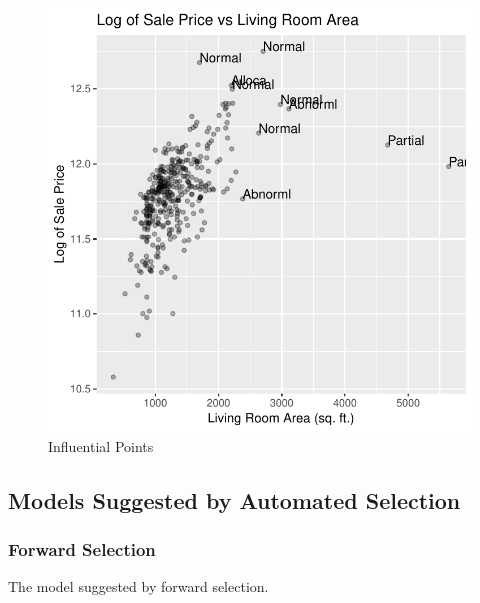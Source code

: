 \documentclass[american,]{article}
\begin{document}
\begin{figure}[htbp]

{\centering \includegraphics[width=0.5\linewidth]{HousePriceRegressionAnalysis_files/figure-latex/infleu-points-1} 

}

\caption{Influential Points}\label{fig:infleu-points}
\end{figure}

\newpage

\hypertarget{models-suggested-by-automated-selection}{%
\subsection{Models Suggested by Automated
Selection}\label{models-suggested-by-automated-selection}}

\hypertarget{forward-selection}{%
\subsubsection{Forward Selection}\label{forward-selection}}

\label{appendix:forSelection}

The model suggested by forward selection.
\end{document}
